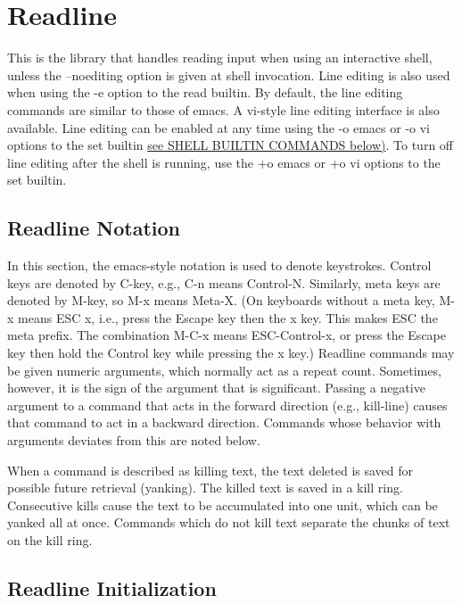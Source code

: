\section{Readline}\label{sec:readline}
This is the library that handles reading input when using an interactive shell, unless the --noediting option is given at shell invocation. Line editing is also used when using the -e option to the read builtin. By default, the line editing commands are similar to those of emacs. A vi-style line editing interface is also available. Line editing can be enabled at any time using the -o emacs or -o vi options to the set builtin \hyperref[sec:shellbuiltincommands]{see SHELL BUILTIN COMMANDS below)}. To turn off line editing after the shell is running, use the +o emacs or +o vi options to the set builtin.

\subsection{Readline Notation}\label{sec:readlinenotation}

In this section, the emacs-style notation is used to denote keystrokes. Control keys are denoted by C-key, e.g., C-n means Control-N. Similarly, meta keys are denoted by M-key, so M-x means Meta-X. (On keyboards without a meta key, M-x means ESC x, i.e., press the Escape key then the x key. This makes ESC the meta prefix. The combination M-C-x means ESC-Control-x, or press the Escape key then hold the Control key while pressing the x key.)
Readline commands may be given numeric arguments, which normally act as a repeat count. Sometimes, however, it is the sign of the argument that is significant. Passing a negative argument to a command that acts in the forward direction (e.g., kill-line) causes that command to act in a backward direction. Commands whose behavior with arguments deviates from this are noted below.

When a command is described as killing text, the text deleted is saved for possible future retrieval (yanking). The killed text is saved in a kill ring. Consecutive kills cause the text to be accumulated into one unit, which can be yanked all at once. Commands which do not kill text separate the chunks of text on the kill ring.

\subsection{Readline Initialization}\label{sec:readlineinitialization}

